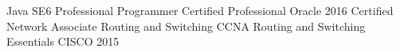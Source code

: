 \begin{cvhonors}
  \cvhonor
    {Java SE6 Professional Programmer}
    {Certified Professional}
    {Oracle}
    {2016}
  \cvhonor
    {Certified Network Associate Routing and Switching }
    {CCNA Routing and Switching Essentials}
    {CISCO}
    {2015}
\end{cvhonors}
